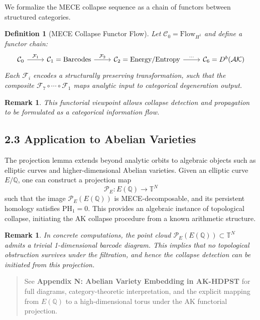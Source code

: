\documentclass[11pt]{article}
\newcommand{\QQ}{\mathbb{Q}}
\newtheorem{definition}[theorem]{Definition}
\newtheorem{remark}[theorem]{Remark}
\begin{document}
We formalize the MECE collapse sequence as a chain of functors between structured categories.

\begin{definition}[MECE Collapse Functor Flow]
Let $\mathcal{C}_0 = \text{Flow}_{H^1}$ and define a functor chain:
\[
\begin{tikzcd}
\mathcal{C}_0 \arrow[r, "\mathcal{F}_1"] & \mathcal{C}_1 = \text{Barcodes} \arrow[r, "\mathcal{F}_2"] & \mathcal{C}_2 = \text{Energy/Entropy} \arrow[r, "\cdots"] & \mathcal{C}_6 = D^b(\mathcal{AK})
\end{tikzcd}
\]
Each $\mathcal{F}_i$ encodes a structurally preserving transformation, such that the composite $\mathcal{F}_7 \circ \cdots \circ \mathcal{F}_1$ maps analytic input to categorical degeneration output.
\end{definition}

\begin{remark}
This functorial viewpoint allows collapse detection and propagation to be formulated as a categorical information flow.
\end{remark}

\subsection*{2.3 Application to Abelian Varieties}

The projection lemma extends beyond analytic orbits to algebraic objects such as elliptic curves and higher-dimensional Abelian varieties.  
Given an elliptic curve \( E/\QQ \), one can construct a projection map
\[
\mathcal{P}_E: E(\QQ) \longrightarrow \mathbb{T}^N
\]
such that the image \( \mathcal{P}_E(E(\QQ)) \) is MECE-decomposable, and its persistent homology satisfies \( \mathrm{PH}_1 = 0 \).  
This provides an algebraic instance of topological collapse, initiating the AK collapse procedure from a known arithmetic structure.

\begin{remark}
In concrete computations, the point cloud \( \mathcal{P}_E(E(\QQ)) \subset \mathbb{T}^N \) admits a trivial 1-dimensional barcode diagram.  
This implies that no topological obstruction survives under the filtration, and hence the collapse detection can be initiated from this projection.
\end{remark}

\begin{quote}
See \textbf{Appendix N: Abelian Variety Embedding in AK-HDPST} for full diagrams, category-theoretic interpretation,  
and the explicit mapping from \( E(\QQ) \) to a high-dimensional torus under the AK functorial projection.
\end{quote}
\end{document}
